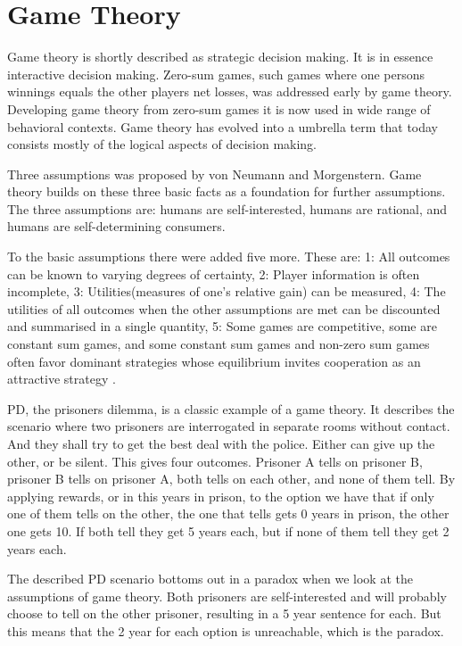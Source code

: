 \documentclass[12pt, a4paper]{article}
\begin{document}
\section{Game Theory}
Game theory is shortly described as strategic decision making. It is in essence
interactive decision making. Zero-sum games, such games where one persons
winnings equals the other players net losses, was addressed early by game
theory. Developing game theory from zero-sum games it is now used in wide
range of behavioral contexts. Game theory has evolved into a umbrella term that
today consists mostly of the logical aspects of decision making.\cite{wiki}

Three assumptions was proposed by von Neumann and Morgenstern. Game theory
builds on these three basic facts as a foundation for further assumptions. The
three assumptions are: humans are self-interested, humans are rational, and
humans are self-determining consumers.\cite{psyinvest}

To the basic assumptions there were added five more. These are: 
1: All outcomes can be known to varying degrees of certainty, 2: Player
information is often incomplete, 3: Utilities(measures of one's relative gain)
can be measured, 4: The utilities of all outcomes when the other assumptions
are met can be discounted and summarised in a single quantity, 5: Some games
are competitive, some are constant sum games, and some constant sum games and
non-zero sum games often favor dominant strategies whose equilibrium invites
cooperation as an attractive strategy \cite{psyinvest}.

PD, the prisoners dilemma, is a classic example of a game theory. It describes
the scenario where two prisoners are interrogated in separate rooms without
contact. And they shall try to get the best deal with the police. Either can
give up the other, or be silent. This gives four outcomes. Prisoner A tells on
prisoner B, prisoner B tells on prisoner A, both tells on each other, and none
of them tell. By applying rewards, or in this years in prison, to the option
we have that if only one of them tells on the other, the one that tells gets 0
years in prison, the other one gets 10. If both tell they get 5 years each, but
if none of them tell they get 2 years each.\cite{psyinvest}

The described PD scenario bottoms out in a paradox when we look at the
assumptions of game theory. Both prisoners are self-interested and will
probably choose to tell on the other prisoner, resulting in a 5 year sentence
for each. But this means that the 2 year for each option is unreachable, which
is the paradox. 
\end{document}
